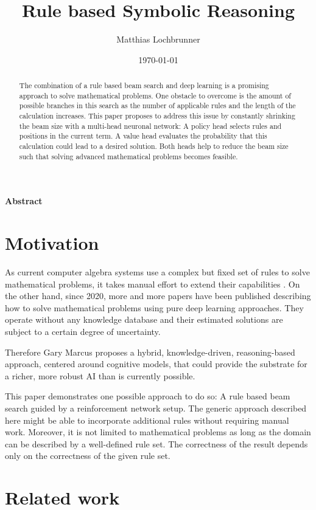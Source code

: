 \documentclass{scrartcl}
\title{Rule based Symbolic Reasoning}
\author{Matthias Lochbrunner}
\date{\today}
\theoremstyle{definition}
\begin{document}
\maketitle
\begin{center}
	\textbf{Abstract}
\end{center}
\begin{abstract}
	The combination of a rule based beam search and deep learning is a promising approach to solve mathematical problems.
	One obstacle to overcome is the amount of possible branches in this search as the number of applicable rules and the length of the calculation increases.
	This paper proposes to address this issue by constantly shrinking the beam size with a multi-head neuronal network:
	A policy head selects rules and positions in the current term.
	A value head evaluates the probability that this calculation could lead to a desired solution.
	Both heads help to reduce the beam size such that solving advanced mathematical problems becomes feasible.
\end{abstract}

\section{Motivation}

As current computer algebra systems use a complex but fixed set of rules to solve mathematical problems,
it takes manual effort to extend their capabilities \cite{wolfram}.
On the other hand, since 2020, more and more papers have been published describing how to solve mathematical problems using pure deep learning approaches.
They operate without any knowledge database and their estimated solutions are subject to a certain degree of uncertainty.

Therefore Gary Marcus proposes a hybrid, knowledge-driven, reasoning-based approach, centered around cognitive models,
that could provide the substrate for a richer, more robust AI than is currently possible. \cite{marcus2020decade}

This paper demonstrates one possible approach to do so:
A rule based beam search guided by a reinforcement network setup.
The generic approach described here might be able to incorporate additional rules without requiring manual work.
Moreover, it is not limited to mathematical problems as long as the domain can be described by a well-defined rule set.
The correctness of the result depends only on the correctness of the given rule set.

\section{Related work}
\end{document}
